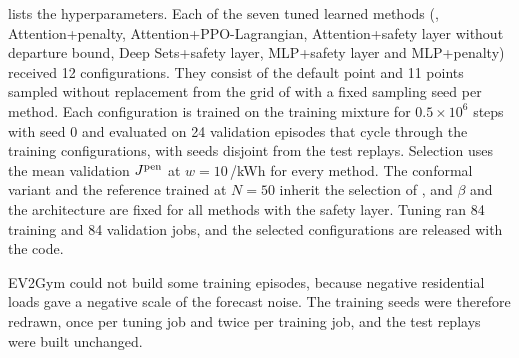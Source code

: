  lists the hyperparameters.
Each of the seven tuned learned methods (\method{}, Attention+penalty, Attention+PPO-Lagrangian, Attention+safety layer without departure bound, Deep Sets+safety layer, MLP+safety layer and MLP+penalty) received 12 configurations.
They consist of the default point and 11 points sampled without replacement from the grid of  with a fixed sampling seed per method.
Each configuration is trained on the training mixture for $0.5\times10^{6}$ steps with seed 0 and evaluated on 24 validation episodes that cycle through the training configurations, with seeds disjoint from the test replays.
Selection uses the mean validation $J^{\mathrm{pen}}$ at $w=10$\,\texteuro/kWh for every method.
The conformal variant and the reference trained at $N=50$ inherit the selection of \method{}, and $\beta$ and the architecture are fixed for all methods with the safety layer.
Tuning ran 84 training and 84 validation jobs, and the selected configurations are released with the code.

EV2Gym could not build some training episodes, because negative residential loads gave a negative scale of the forecast noise.
The training seeds were therefore redrawn, once per tuning job and twice per training job, and the test replays were built unchanged.

